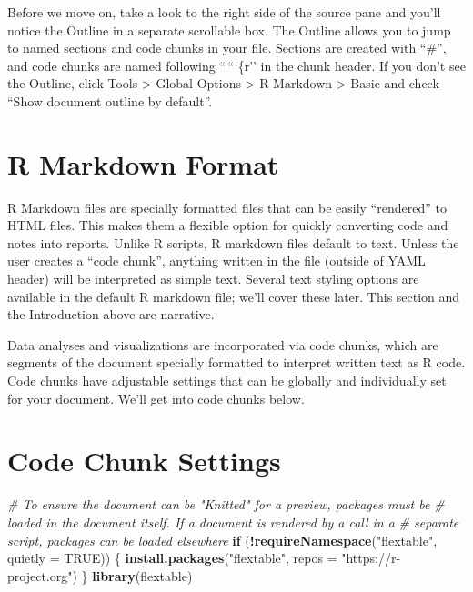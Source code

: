 \documentclass[
]{article}
\newenvironment{Shaded}{\begin{snugshade}}{\end{snugshade}}
\newcommand{\AttributeTok}[1]{\textcolor[rgb]{0.13,0.29,0.53}{#1}}
\newcommand{\CommentTok}[1]{\textcolor[rgb]{0.56,0.35,0.01}{\textit{#1}}}
\newcommand{\ConstantTok}[1]{\textcolor[rgb]{0.56,0.35,0.01}{#1}}
\newcommand{\ControlFlowTok}[1]{\textcolor[rgb]{0.13,0.29,0.53}{\textbf{#1}}}
\newcommand{\FunctionTok}[1]{\textcolor[rgb]{0.13,0.29,0.53}{\textbf{#1}}}
\newcommand{\NormalTok}[1]{#1}
\newcommand{\SpecialCharTok}[1]{\textcolor[rgb]{0.81,0.36,0.00}{\textbf{#1}}}
\newcommand{\StringTok}[1]{\textcolor[rgb]{0.31,0.60,0.02}{#1}}
\begin{document}
Before we move on, take a look to the right side of the source pane and
you'll notice the Outline in a separate scrollable box. The Outline
allows you to jump to named sections and code chunks in your file.
Sections are created with ``\#'', and code chunks are named following
``\,```\{r'' in the chunk header. If you don't see the Outline, click
Tools \textgreater{} Global Options \textgreater{} R Markdown
\textgreater{} Basic and check ``Show document outline by default''.

\section{R Markdown Format}\label{r-markdown-format}

R Markdown files are specially formatted files that can be easily
``rendered'' to HTML files. This makes them a flexible option for
quickly converting code and notes into reports. Unlike R scripts, R
markdown files default to text. Unless the user creates a ``code
chunk'', anything written in the file (outside of YAML header) will be
interpreted as simple text. Several text styling options are available
in the default R markdown file; we'll cover these later. This section
and the Introduction above are narrative.

Data analyses and visualizations are incorporated via code chunks, which
are segments of the document specially formatted to interpret written
text as R code. Code chunks have adjustable settings that can be
globally and individually set for your document. We'll get into code
chunks below.

\section{Code Chunk Settings}\label{code-chunk-settings}

\begin{Shaded}
\end{Shaded}

\begin{Shaded}
\begin{Highlighting}[]
\CommentTok{\# To ensure the document can be "Knitted" for a preview, packages must be}
\CommentTok{\# loaded in the document itself. If a document is rendered by a call in a }
\CommentTok{\# separate script, packages can be loaded elsewhere }
\ControlFlowTok{if}\NormalTok{ (}\SpecialCharTok{!}\FunctionTok{requireNamespace}\NormalTok{(}\StringTok{"flextable"}\NormalTok{, }\AttributeTok{quietly =} \ConstantTok{TRUE}\NormalTok{)) \{}
  \FunctionTok{install.packages}\NormalTok{(}\StringTok{"flextable"}\NormalTok{, }\AttributeTok{repos =} \StringTok{"https://r{-}project.org"}\NormalTok{)}
\NormalTok{\}}
\FunctionTok{library}\NormalTok{(flextable)}
\end{Highlighting}
\end{Shaded}
\end{document}
